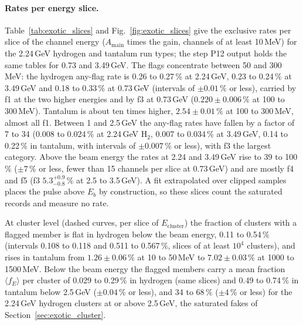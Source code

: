 \documentclass[11pt]{article}
\begin{document}
\paragraph{Rates per energy slice.} Table~\ref{tab:exotic_slices} and Fig.~\ref{fig:exotic_slices} give the exclusive rates per slice of the channel energy ($A_{\mathrm{main}}$ times the gain, channels of at least 10\,MeV) for the 2.24\,GeV hydrogen and tantalum run types; the step P12 output holds the same tables for 0.73 and 3.49\,GeV. The flags concentrate between 50 and 300\,MeV: the hydrogen any-flag rate is 0.26 to 0.27\,\% at 2.24\,GeV, 0.23 to 0.24\,\% at 3.49\,GeV and 0.18 to 0.33\,\% at 0.73\,GeV (intervals of $\pm 0.01$\,\% or less), carried by f1 at the two higher energies and by f3 at 0.73\,GeV ($0.220 \pm 0.006\,\%$ at 100 to 300\,MeV). Tantalum is about ten times higher, $2.54 \pm 0.01\,\%$ at 100 to 300\,MeV, almost all f1. Between 1 and 2.5\,GeV the any-flag rates have fallen by a factor of 7 to 34 (0.008 to 0.024\,\% at 2.24\,GeV H$_2$, 0.007 to 0.034\,\% at 3.49\,GeV, 0.14 to 0.22\,\% in tantalum, with intervals of $\pm 0.007$\,\% or less), with f3 the largest category. Above the beam energy the rates at 2.24 and 3.49\,GeV rise to 39 to 100\,\% ($\pm 7$\,\% or less, fewer than 15 channels per slice at 0.73\,GeV) and are mostly f4 and f5 (f3 $5.3^{+0.9}_{-0.8}\,\%$ at 2.5 to 3.5\,GeV). A fit extrapolated over clipped samples places the pulse above $E_b$ by construction, so these slices count the saturated records and measure no rate.

At cluster level (dashed curves, per slice of $E_{\mathrm{cluster}}$) the fraction of clusters with a flagged member is flat in hydrogen below the beam energy, 0.11 to 0.54\,\% (intervals 0.108 to 0.118 and 0.511 to 0.567\,\%, slices of at least $10^4$ clusters), and rises in tantalum from $1.26 \pm 0.06\,\%$ at 10 to 50\,MeV to $7.02 \pm 0.03\,\%$ at 1000 to 1500\,MeV. Below the beam energy the flagged members carry a mean fraction $\langle f_E \rangle$ per cluster of 0.029 to 0.29\,\% in hydrogen (same slices) and 0.49 to 0.74\,\% in tantalum below 2.5\,GeV ($\pm 0.04$\,\% or less), and 34 to 68\,\% ($\pm 4$\,\% or less) for the 2.24\,GeV hydrogen clusters at or above 2.5\,GeV, the saturated fakes of Section~\ref{sec:exotic_cluster}.
\end{document}
